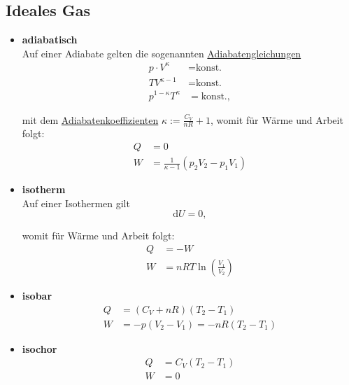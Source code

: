 \documentclass{article}
\newcommand{\diff}{\mathrm{d}}
\newcommand{\lr}[1]{\left(#1\right)}
\begin{document}
\subsection{Ideales Gas}
	\begin{itemize}
		\item \textbf{adiabatisch}\\
		Auf einer Adiabate gelten die sogenannten \underline{Adiabatengleichungen}
			\begin{align}
				p \cdot V^\kappa &= \text{konst.} \\
				T V^{\kappa - 1} &= \text{konst.} \\
				p^{1-\kappa} T^\kappa &= \text{konst.},
			\end{align}
		
		mit dem \underline{Adiabatenkoeffizienten} $\kappa := \frac{C_V}{nR} + 1$, womit für Wärme und Arbeit folgt:
			\begin{align}
				Q &= 0 \\
				W &= \frac{1}{\kappa-1} \lr{ p_2 V_2 - p_1 V_1 }
			\end{align}
		
		
		\item \textbf{isotherm}\\
		Auf einer Isothermen gilt
			\begin{equation}
				\diff U = 0,
			\end{equation}
		
		womit für Wärme und Arbeit folgt:
			\begin{align}
				Q &= -W \\
				W &= n R T \ln \lr{ \frac{V_1}{V_2} }
			\end{align}
		
		
		\item \textbf{isobar}
			\begin{align}
				Q &= (C_V + n R)(T_2 - T_1) \\
				W &= -p (V_2 - V_1) = - n R (T_2 - T_1)
			\end{align}
		
		
		\item \textbf{isochor}
			\begin{align}
				Q &= C_V(T_2 - T_1) \\
				W &= 0
			\end{align}
	\end{itemize}


\newpage
\end{document}
